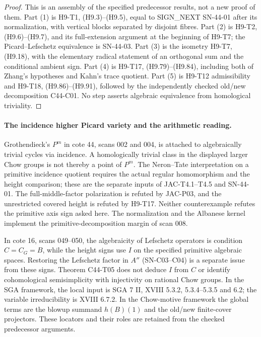 \begin{proof}
This is an assembly of the specified predecessor results, not a new
proof of them. Part (1) is H9-T1, (H9.3)--(H9.5), equal to
SIGN\_NEXT SN-44-01 after its normalization, with vertical blocks
separated by disjoint fibres. Part (2) is H9-T2, (H9.6)--(H9.7),
and its full-extension argument at the beginning of H9-T7;
the Picard--Lefschetz equivalence is SN-44-03. Part (3) is the
isometry H9-T7, (H9.18), with the elementary radical statement
of an orthogonal sum and the conditional ambient sign. Part (4)
is H9-T17, (H9.79)--(H9.84), including both of Zhang's hypotheses
and Kahn's trace quotient. Part (5) is H9-T12 admissibility and
H9-T18, (H9.86)--(H9.91), followed by the independently checked
old/new decomposition C44-C01. No step asserts algebraic
equivalence from homological triviality.
\end{proof}

\paragraph{The incidence higher Picard variety and the arithmetic reading.}
Grothendieck's $P^m$ in cote 44, scans 002 and 004, is attached
to algebraically trivial cycles via incidence. A homologically
trivial class in the displayed larger Chow groups is not thereby
a point of $P^m$. The Neron--Tate interpretation on a primitive
incidence quotient requires the actual regular homomorphism and
the height comparison; these are the separate inputs of
JAC-T4.1--T4.5 and SN-44-01. The full-middle-factor polarization
is refuted by JAC-P03, and the unrestricted covered height is
refuted by H9-T17. Neither counterexample refutes the primitive
axis sign asked here. The normalization and the Albanese kernel
implement the primitive-decomposition margin of scan 008.

In cote 16, scans 049--050, the algebraicity of Lefschetz operators
is condition $C=C_G=B$, while the height signs use $I$ on the
specified primitive algebraic spaces. Restoring the Lefschetz
factor in $A''$ (SN-C03--C04) is a separate issue from these
signs. Theorem C44-T05 does not deduce $I$ from $C$ or identify
cohomological semisimplicity with injectivity on rational Chow
groups. In the SGA framework, the local input is SGA 7 II,
XVIII 5.3.2, 5.3.4--5.3.5 and 6.2; the variable irreducibility
is XVIII 6.7.2. In the Chow-motive framework the global terms
are the blowup summand $h(B)(1)$ and the old/new finite-cover
projectors. These locators and their roles are retained from
the checked predecessor arguments.
